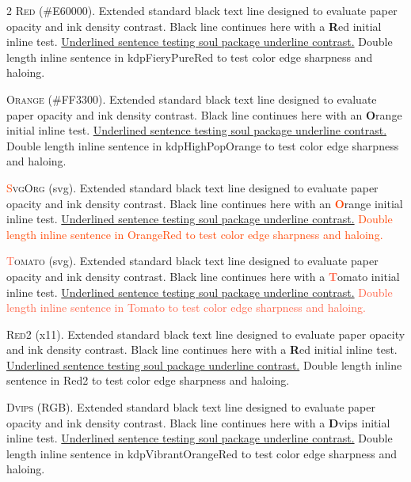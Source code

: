 \documentclass[9pt]{article}
\let\oldlettrine\lettrine
\renewcommand{\lettrine}[3][]{%
	\clubpenalty=10000
	\oldlettrine[#1]{#2}{#3}%
}
\begin{document}
\begin{multicols}{2}
\lettrine[lines=2]{\textcolor{kdpFieryPureRed}{R}}{ed} (\#E60000). Extended standard black text line designed to evaluate paper opacity and ink density contrast. Black line continues here with a \textbf{\textcolor{kdpFieryPureRed}{R}}ed initial inline test. \ul{Underlined sentence testing soul package underline contrast.} \textcolor{kdpFieryPureRed}{Double length inline sentence in kdpFieryPureRed to test color edge sharpness and haloing.}
\medskip

\lettrine[lines=2]{\textcolor{kdpHighPopOrange}{O}}{range} (\#FF3300). Extended standard black text line designed to evaluate paper opacity and ink density contrast. Black line continues here with an \textbf{\textcolor{kdpHighPopOrange}{O}}range initial inline test. \ul{Underlined sentence testing soul package underline contrast.} \textcolor{kdpHighPopOrange}{Double length inline sentence in kdpHighPopOrange to test color edge sharpness and haloing.}
\medskip

\lettrine[lines=2]{\textcolor{OrangeRed}{S}}{vgOrg} (svg). Extended standard black text line designed to evaluate paper opacity and ink density contrast. Black line continues here with an \textbf{\textcolor{OrangeRed}{O}}range initial inline test. \ul{Underlined sentence testing soul package underline contrast.} \textcolor{OrangeRed}{Double length inline sentence in OrangeRed to test color edge sharpness and haloing.}
\medskip

\lettrine[lines=2]{\textcolor{Tomato}{T}}{omato} (svg). Extended standard black text line designed to evaluate paper opacity and ink density contrast. Black line continues here with a \textbf{\textcolor{Tomato}{T}}omato initial inline test. \ul{Underlined sentence testing soul package underline contrast.} \textcolor{Tomato}{Double length inline sentence in Tomato to test color edge sharpness and haloing.}
\medskip

\lettrine[lines=2]{\textcolor{Red2}{R}}{ed2} (x11). Extended standard black text line designed to evaluate paper opacity and ink density contrast. Black line continues here with a \textbf{\textcolor{Red2}{R}}ed initial inline test. \ul{Underlined sentence testing soul package underline contrast.} \textcolor{Red2}{Double length inline sentence in Red2 to test color edge sharpness and haloing.}
\medskip

\lettrine[lines=2]{\textcolor{kdpVibrantOrangeRed}{D}}{vips} (RGB). Extended standard black text line designed to evaluate paper opacity and ink density contrast. Black line continues here with a \textbf{\textcolor{kdpVibrantOrangeRed}{D}}vips initial inline test. \ul{Underlined sentence testing soul package underline contrast.} \textcolor{kdpVibrantOrangeRed}{Double length inline sentence in kdpVibrantOrangeRed to test color edge sharpness and haloing.}
\medskip


\end{multicols}
\end{document}
